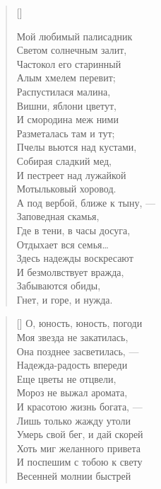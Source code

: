 \newpage

\settowidth{\versewidth}{Мой любимый полисадник}
\begin{verse}[\versewidth]
\begin{altverse}
Мой любимый палисадник\\
Светом солнечным залит,\\
Частокол его старинный\\
Алым хмелем перевит;\\
Распустилася малина,\\
Вишни, яблони цветут,\\
И смородина меж ними\\
Разметалась там и тут;\\
Пчелы вьются над кустами,\\
Собирая сладкий мед,\\
И пестреет над лужайкой\\
Мотыльковый хоровод.\\
А под вербой, ближе к тыну, ---\\
Заповедная скамья,\\
Где в тени, в часы досуга,\\
Отдыхает вся семья\ldots\\
Здесь надежды воскресают\\
И безмолвствует вражда,\\
Забываются обиды,\\
Гнет, и горе, и нужда.
\end{altverse}
\end{verse}

\newpage
\vspace*{0cm}




\settowidth{\versewidth}{О, юность, юность, погоди\ldotse}
\begin{verse}[\versewidth]
О, юность, юность, погоди\ldotse\\
Моя звезда не закатилась,\\
Она позднее засветилась, ---\\
Надежда-радость впереди\ldotse\\
Еще цветы не отцвели,\\
Мороз не выжал аромата,\\
И красотою жизнь богата, ---\\
Лишь только жажду утоли\ldotst\\
Умерь свой бег, и дай скорей\\
Хоть миг желанного привета\ldotst\\
И поспешим с тобою к свету\\
Весенней молнии быстрей\ldotst
\end{verse}


